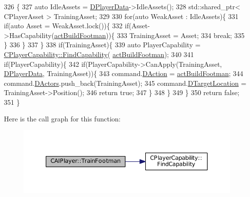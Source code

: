 \begin{DoxyCode}
326                                                           \{
327     \textcolor{keyword}{auto} IdleAssets = \hyperlink{classCAIPlayer_a83b5113c8f7e80df54940b647c5ee2e6}{DPlayerData}->IdleAssets();
328     std::shared\_ptr< CPlayerAsset > TrainingAsset;
329     
330     \textcolor{keywordflow}{for}(\textcolor{keyword}{auto} WeakAsset : IdleAssets)\{
331         \textcolor{keywordflow}{if}(\textcolor{keyword}{auto} Asset = WeakAsset.lock())\{
332             \textcolor{keywordflow}{if}(Asset->HasCapability(\hyperlink{GameDataTypes_8h_a35b98ce26aca678b03c6f9f76e4778cea48885d6af1b7c05c5887978f88556662}{actBuildFootman}))\{
333                 TrainingAsset = Asset;
334                 \textcolor{keywordflow}{break};
335             \}
336         \}
337     \}
338     \textcolor{keywordflow}{if}(TrainingAsset)\{
339         \textcolor{keyword}{auto} PlayerCapability = \hyperlink{classCPlayerCapability_a881ba4b87385d7cfe5cb6ced2d26f226}{CPlayerCapability::FindCapability}(
      \hyperlink{GameDataTypes_8h_a35b98ce26aca678b03c6f9f76e4778cea48885d6af1b7c05c5887978f88556662}{actBuildFootman}); 
340         
341         \textcolor{keywordflow}{if}(PlayerCapability)\{
342             \textcolor{keywordflow}{if}(PlayerCapability->CanApply(TrainingAsset, \hyperlink{classCAIPlayer_a83b5113c8f7e80df54940b647c5ee2e6}{DPlayerData}, TrainingAsset))\{
343                 command.\hyperlink{structSPlayerCommandRequest_a80897bbccf2c4e0b148a7aa815a926c6}{DAction} = \hyperlink{GameDataTypes_8h_a35b98ce26aca678b03c6f9f76e4778cea48885d6af1b7c05c5887978f88556662}{actBuildFootman};
344                 command.\hyperlink{structSPlayerCommandRequest_aa37fc01519676345703d78b9f573894a}{DActors}.push\_back(TrainingAsset);       
345                 command.\hyperlink{structSPlayerCommandRequest_a701702b94ca2fd2738e95ef6711dd41a}{DTargetLocation} = TrainingAsset->Position();
346                 \textcolor{keywordflow}{return} \textcolor{keyword}{true};
347             \}
348         \}
349     \}
350     \textcolor{keywordflow}{return} \textcolor{keyword}{false};
351 \}
\end{DoxyCode}
Here is the call graph for this function\+:\nopagebreak
\begin{figure}[H]
\begin{center}
\leavevmode
\includegraphics[width=350pt]{classCAIPlayer_aa3f9c1d0d449a45a24e065d2086527b0_cgraph}
\end{center}
\end{figure}
